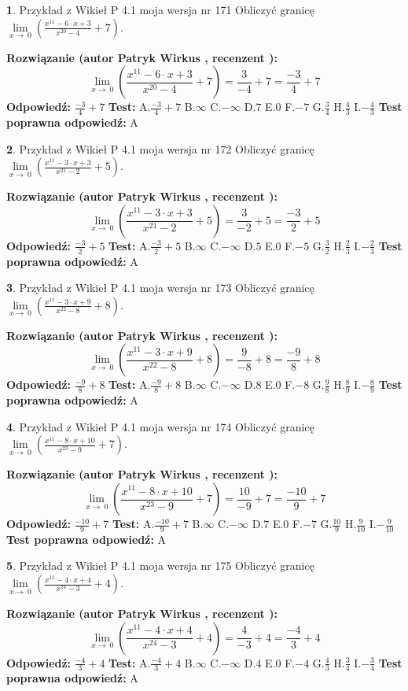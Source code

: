 \documentclass[12pt, a4paper]{article}
\theoremstyle{definition} %
\newtheorem{zad}{}
\newcommand{\zadStart}[1]{\begin{zad}#1\newline}
\newcommand{\zadStop}{\end{zad}}
\newcommand{\rozwStart}[2]{\noindent \textbf{Rozwiązanie (autor #1 , recenzent #2): }\newline}
\newcommand{\rozwStop}{\newline}
\newcommand{\odpStart}{\noindent \textbf{Odpowiedź:}\newline}
\newcommand{\odpStop}{\newline}
\newcommand{\testStart}{\noindent \textbf{Test:}\newline}
\newcommand{\testStop}{\newline}
\newcommand{\kluczStart}{\noindent \textbf{Test poprawna odpowiedź:}\newline}
\newcommand{\kluczStop}{\newline}
\begin{document}
\zadStart{Przykład z Wikieł P 4.1 moja wersja nr 171}
Obliczyć granicę $\lim\limits_{x\to\ 0}(\frac{x^{11}-6 \cdot x +3}{x^{20}-4}+7)$.
\zadStop
\rozwStart{Patryk Wirkus}{}
$$\lim\limits_{x\to\ 0}(\frac{x^{11}-6 \cdot x +3}{x^{20}-4}+7)=\frac{3}{-4}+7=\frac{-3}{4}+7$$
\rozwStop
\odpStart
$\frac{-3}{4}+7$
\odpStop
\testStart
A.$\frac{-3}{4}+7$
B.$\infty$
C.$-\infty$
D.$7$
E.$0$
F.$-7$
G.$\frac{3}{4}$
H.$\frac{4}{3}$
I.$-\frac{4}{3}$
\testStop
\kluczStart
A
\kluczStop



\zadStart{Przykład z Wikieł P 4.1 moja wersja nr 172}
Obliczyć granicę $\lim\limits_{x\to\ 0}(\frac{x^{11}-3 \cdot x +3}{x^{21}-2}+5)$.
\zadStop
\rozwStart{Patryk Wirkus}{}
$$\lim\limits_{x\to\ 0}(\frac{x^{11}-3 \cdot x +3}{x^{21}-2}+5)=\frac{3}{-2}+5=\frac{-3}{2}+5$$
\rozwStop
\odpStart
$\frac{-3}{2}+5$
\odpStop
\testStart
A.$\frac{-3}{2}+5$
B.$\infty$
C.$-\infty$
D.$5$
E.$0$
F.$-5$
G.$\frac{3}{2}$
H.$\frac{2}{3}$
I.$-\frac{2}{3}$
\testStop
\kluczStart
A
\kluczStop



\zadStart{Przykład z Wikieł P 4.1 moja wersja nr 173}
Obliczyć granicę $\lim\limits_{x\to\ 0}(\frac{x^{11}-3 \cdot x +9}{x^{22}-8}+8)$.
\zadStop
\rozwStart{Patryk Wirkus}{}
$$\lim\limits_{x\to\ 0}(\frac{x^{11}-3 \cdot x +9}{x^{22}-8}+8)=\frac{9}{-8}+8=\frac{-9}{8}+8$$
\rozwStop
\odpStart
$\frac{-9}{8}+8$
\odpStop
\testStart
A.$\frac{-9}{8}+8$
B.$\infty$
C.$-\infty$
D.$8$
E.$0$
F.$-8$
G.$\frac{9}{8}$
H.$\frac{8}{9}$
I.$-\frac{8}{9}$
\testStop
\kluczStart
A
\kluczStop



\zadStart{Przykład z Wikieł P 4.1 moja wersja nr 174}
Obliczyć granicę $\lim\limits_{x\to\ 0}(\frac{x^{11}-8 \cdot x +10}{x^{23}-9}+7)$.
\zadStop
\rozwStart{Patryk Wirkus}{}
$$\lim\limits_{x\to\ 0}(\frac{x^{11}-8 \cdot x +10}{x^{23}-9}+7)=\frac{10}{-9}+7=\frac{-10}{9}+7$$
\rozwStop
\odpStart
$\frac{-10}{9}+7$
\odpStop
\testStart
A.$\frac{-10}{9}+7$
B.$\infty$
C.$-\infty$
D.$7$
E.$0$
F.$-7$
G.$\frac{10}{9}$
H.$\frac{9}{10}$
I.$-\frac{9}{10}$
\testStop
\kluczStart
A
\kluczStop



\zadStart{Przykład z Wikieł P 4.1 moja wersja nr 175}
Obliczyć granicę $\lim\limits_{x\to\ 0}(\frac{x^{11}-4 \cdot x +4}{x^{24}-3}+4)$.
\zadStop
\rozwStart{Patryk Wirkus}{}
$$\lim\limits_{x\to\ 0}(\frac{x^{11}-4 \cdot x +4}{x^{24}-3}+4)=\frac{4}{-3}+4=\frac{-4}{3}+4$$
\rozwStop
\odpStart
$\frac{-4}{3}+4$
\odpStop
\testStart
A.$\frac{-4}{3}+4$
B.$\infty$
C.$-\infty$
D.$4$
E.$0$
F.$-4$
G.$\frac{4}{3}$
H.$\frac{3}{4}$
I.$-\frac{3}{4}$
\testStop
\kluczStart
A
\kluczStop
\end{document}

